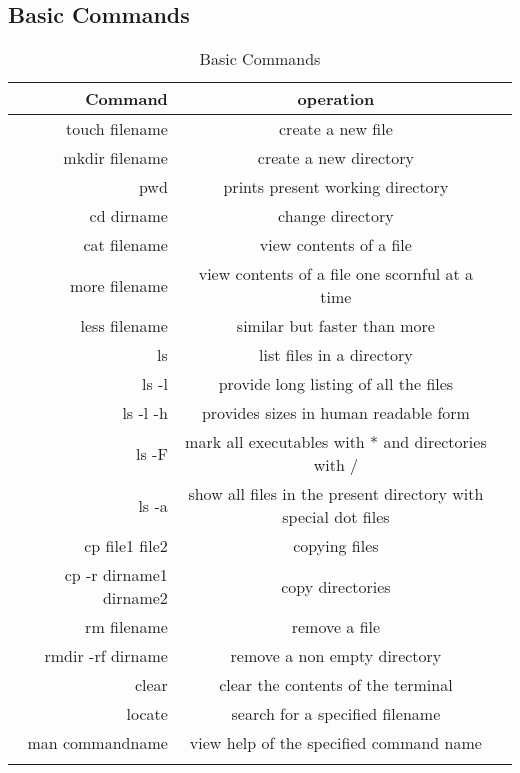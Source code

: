 \documentclass{article}
\begin{document}
\subsection{Basic Commands}
\begin{table}[htb]
\caption{Basic Commands}

\label{Basic commands in Linux}
\begin{tabular}{rcc}
\noalign{\smallskip} \hline \hline \noalign{\smallskip}
Command & operation \\

\hline
touch filename        & create a new file\\
mkdir filename	&create a new directory\\
pwd		&prints present working directory\\
cd dirname	&change directory\\
\hline
cat filename	&view contents of a file\\
more filename	&view contents of a file one scornful at a time\\
less filename 	&similar but faster than more\\
\hline
ls			&list files in a directory\\
ls -l 			&provide long listing of all the files\\
ls -l -h		&provides sizes in human readable form\\
ls -F			&mark all executables with * and directories with / \\
ls -a			&show all files in the present directory with special dot files\\
\hline
cp file1 file2	&copying files\\
cp -r dirname1 dirname2	&copy directories\\
\hline
rm filename	&remove a file\\
rmdir -rf dirname	&remove a non empty directory\\
\hline
clear			&clear the contents of the terminal\\
locate		&search for a specified filename\\
man commandname	&view help of the specified command name\\
\hline
\noalign{\smallskip} \hline \noalign{\smallskip}
\end{tabular}
\end{table}

\newpage
\end{document}
